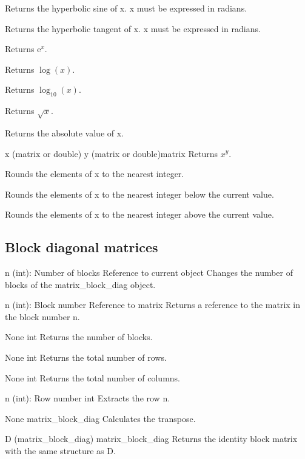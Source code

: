 {Returns the hyperbolic sine of x. x must be expressed in radians.}

{Returns the hyperbolic tangent of x. x must be expressed in radians.}

{Returns $\mathrm{e}^x$.}

{Returns $\log(x)$.}

{Returns $\log_{10}(x)$.}

{Returns $\sqrt{x}$.}

{Returns the absolute value of x.}

{x (matrix or double)\newline
y (matrix or double)}{matrix}
{Returns $x^y$.}

{Rounds the elements of x to the nearest integer.}

{Rounds the elements of x to the nearest integer below the current value.}

{Rounds the elements of x to the nearest integer above the current value.}

\subsection{Block diagonal matrices}

{n (int): Number of blocks}
{Reference to current object}
{Changes the number of blocks of the matrix\_block\_diag object.}

{n (int): Block number}
{Reference to matrix}
{Returns a reference to the matrix in the block number n.}

{None}
{int}
{Returns the number of blocks.}

{None}
{int}
{Returns the total number of rows.}

{None}
{int}
{Returns the total number of columns.}

{n (int): Row number}
{int}
{Extracts the row n.}

{None}
{matrix\_block\_diag}
{Calculates the transpose.}

{D (matrix\_block\_diag)}
{matrix\_block\_diag}
{Returns the identity block matrix with the same structure as D.}


\funcrefend

